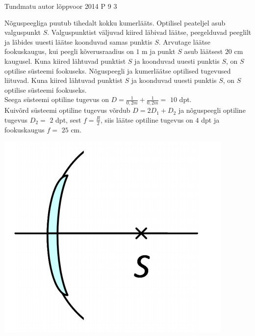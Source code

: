 {Tundmatu autor} %
{lõppvoor} %
{2014} %
{P 9} %
{3} %
{
\ifStatement
Nõguspeegliga puutub tihedalt kokku kumerlääts. Optilisel peateljel asub valguspunkt $S$. Valguspunktist väljuvad kiired läbivad läätse, peegelduvad peeglilt ja läbides uuesti läätse koonduvad samas punktis $S$. Arvutage läätse fookuskaugus, kui peegli kõverusraadius on $1$ m ja punkt $S$ asub läätsest $20$ cm kaugusel.
\fi
\ifHint
Kuna kiired lähtuvad punktist $S$ ja koonduvad uuesti punktis $S$, on $S$ optilise süsteemi fookuseks. Nõguspeegli ja kumerläätse optilised tugevused liituvad.
\fi
\ifSolution
Kuna kiired lähtuvad punktist $S$ ja koonduvad uuesti punktis $S$, on $S$ optilise süsteemi fookuseks. \\
Seega süsteemi optiline tugevus on $D = \frac{1}{0,2 m} + \frac{1}{0,2 m} =$ $10$ dpt. \\
Kuivõrd süsteemi optiline tugevus võrdub $D = 2D_1 + D_2$ 
ja nõguspeegli optiline tugevus $D_2 =$ $2$ dpt, sest $f = \frac{R}{2}$, siis läätse optiline tugevus on $4$ dpt ja fookuskaugus $f =$ $25$ cm.
\begin{center}
	\includegraphics[width=0.5\linewidth]{2014-v3p-09-lah.PNG}
\end{center}
\fi
}